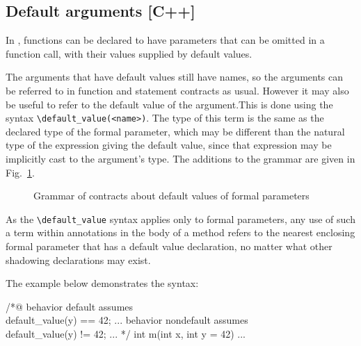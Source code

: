 \subsection{Default arguments [C++]}
\label{sec:defargs}
\experimental

In \lang, functions can be declared to have parameters that can be omitted in a function call, with their values supplied by default values. 

The arguments that have default values still have names, so the arguments can be referred to in function and statement contracts as usual. However it may also be useful to refer to the default value of the argument.This is done using the syntax \lstinline|\default_value(<name>)|. The type of this term is the same as the declared type of the formal parameter, which may be different than the natural type of the expression giving the default value, since that expression may be implicitly cast to the argument's type. 
The additions to the grammar are given in Fig.~\ref{fig:gram:default-values}.

\begin{figure}[t]
	\begin{cadre}
		
	\end{cadre}
	\caption{Grammar of contracts about default values of formal parameters}
	\label{fig:gram:default-values}
\end{figure}

As the \lstinline|\default_value| syntax applies only to formal parameters, any use of such a term within annotations in the body of a method refers to the nearest enclosing 
formal parameter that has a default value declaration, no
matter what other shadowing declarations may exist.

The example below demonstrates the syntax:

\begin{example}
/*@ behavior default
      assumes \\default\_value(y) == 42;
      ...
    behavior nondefault
      assumes \\default\_value(y) != 42;
      ...
*/
int m(int x, int y = 42) { ... }

\end{example}

